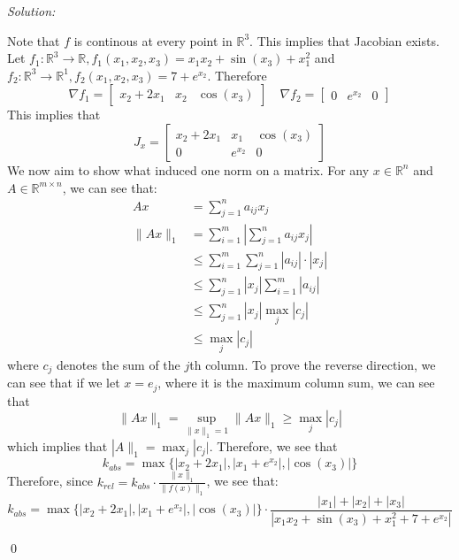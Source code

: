 \documentclass[12pt]{article}
\newenvironment{problem}[2][Problem]{\begin{trivlist}
\item[\hskip \labelsep {\bfseries #1}\hskip \labelsep {\bfseries #2.}]}{\end{trivlist}}
\newenvironment{sol}
    {\emph{Solution:}
    }
    {
    \qed
    }
\newcommand{\R}{\mathbb{R}}
\begin{document}

\begin{problem}{1}
    
\end{problem}
\begin{sol}
    Note that $f$ is continous at every point in $\R^3$. This implies that Jacobian exists. Let $f_1: \R^3 \to \R, f_1(x_1, x_2, x_3) =  x_1 x_2 + \sin(x_3) + x_1^2$ and $f_2: \R^3 \to \R^1, f_2(x_1, x_2, x_3) = 7 + e^{x_2}$. Therefore 
    \[
    \nabla f_1  = \begin{bmatrix}
        x_2 + 2x_1 & x_2 & \cos(x_3)
    \end{bmatrix} \quad 
    \nabla f_2 = \begin{bmatrix}
        0 & e^{x_2} & 0
    \end{bmatrix}
    \]  
    This implies that 
    \[
    J_x = \begin{bmatrix}
        x_2 + 2x_1 & x_1 & \cos(x_3) \\
        0 & e^{x_2} & 0 
    \end{bmatrix}
    \]
    We now aim to show what induced one norm on a matrix. For any $x \in \R^n$ and $A \in \R^{m \times n}$, we can see that:
    \begin{align*}
        Ax &= \sum_{j = 1}^n a_{ij} x_j\\
        \|Ax\|_1 &= \sum_{i = 1}^{m} \left | \sum_{j = 1}^{n} a_{ij} x_j \right |\\
        &\leq \sum_{i = 1}^{m} \sum_{j = 1}^{n} |a_{ij}| \cdot |x_j|\\
        &\leq \sum_{j = 1}^{n} |x_j| \sum_{i = 1}^{m} |a_{ij}|\\
        &\leq \sum_{j = 1}^{n} |x_j| \max_j |c_j|\\
        &\leq \max_j |c_j|
    \end{align*}
    where $c_j$ denotes the sum of the $j$th column. To prove the reverse direction, we can see that if we let $x = e_j$, where it is the maximum column sum, we can see that 
    \[
    \|Ax\|_1 = \sup_{\|x\|_ 1 = 1} \|Ax\|_1 \geq \max_j |c_j |
    \]  
    which implies that $|A\|_1 = \max_j |c_j|$. Therefore, we see that 
    \[
        k_{abs} = \max \{ |x_2 + 2x_1| , |x_1 + e^{x_2}|, |\cos(x_3)|\}
    \]
    Therefore, since $k_{rel} = k_{abs} \cdot \frac{\|x\|_1}{\|f(x)\|_1}$, we see that:
    \[
    k_{abs} = \max \{ |x_2 + 2x_1| , |x_1 + e^{x_2}|, |\cos(x_3)|\} \cdot \frac{|x_1| + |x_2| + |x_3|}{|x_1 x_2 + \sin(x_3) + x_1^2 + 7 + e^{x_2}|}
    \]
\end{sol}
\end{document}
